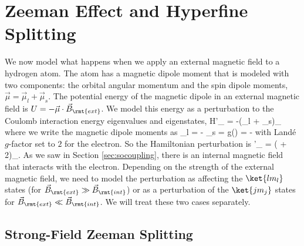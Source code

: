 \chapter{Zeeman Effect and Hyperfine Splitting}
\begin{marginfigure}
\centering
{}
\end{marginfigure}
We now model what happens when we apply an external magnetic field to a hydrogen atom. The atom has a magnetic dipole moment that is modeled with two components: the orbital angular momentum and the spin dipole moments, $\vec{\mu}=\vec{\mu}_l + \vec{\mu}_s$. The potential energy of the magnetic dipole in an external magnetic field is $U = -\vec{\mu}\cdot\vec{B}_\rmt{ext}$. We model this energy as a perturbation to the Coulomb interaction energy eigenvalues and eigenstates,
\beq
H'_ = -\left(\vec{\mu}_l + \vec{\mu}_s\right)\cdot{}_
\eeq
where we write the magnetic dipole moments as
\beq
\vec{\mu}_l = -  \vec{\mu}_s = g\left(\right) = -
\eeq
with Land\'{e} $g$-factor set to $2$ for the electron. So the Hamiltonian perturbation is
\beq
{}'_ = \left( + 2\right)\cdot{}_.
\label{eq:zeemanpert}
\eeq
As we saw in Section \ref{sec:socoupling}, there is an internal magnetic field that interacts with the electron. Depending on the strength of the external magnetic field, we need to model the perturbation as affecting the $\ket{lm_l}$ states (for $\vec{B}_\rmt{ext} \gg \vec{B}_\rmt{int}$) or as a perturbation of the $\ket{jm_j}$ states for $\vec{B}_\rmt{ext} \ll \vec{B}_\rmt{int}$. We will treat these two cases separately.

\section{Strong-Field Zeeman Splitting}

